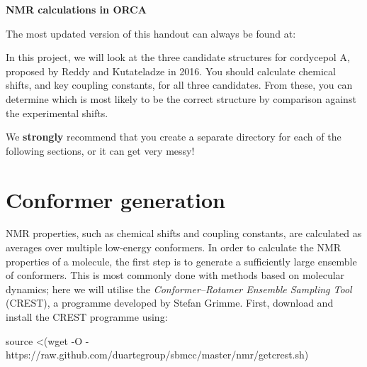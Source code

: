 \documentclass[10pt]{article}
\begin{document}

\textbf{\LARGE NMR calculations in ORCA}

\vspace{0.5cm}

\begin{tcolorbox}[colframe=Green!70!white, colback=Green!10!white, width=0.95\textwidth, center]
    The most updated version of this handout can always be found at:
    \vspace{0.2cm}
    \begin{center}
    \end{center}
\end{tcolorbox}

\vspace{0.2cm}

In this project, we will look at the three candidate structures for cordycepol A, proposed by Reddy and Kutateladze in 2016.\autocite{Reddy2016} You should calculate chemical shifts, and key coupling constants, for all three candidates. From these, you can determine which is most likely to be the correct structure by comparison against the experimental shifts.

\begin{warning}
We \textbf{strongly} recommend that you create a separate directory for each of the following sections, or it can get very messy!
\end{warning}

\section{Conformer generation}

NMR properties, such as chemical shifts and coupling constants, are calculated as averages over multiple low-energy conformers. In order to calculate the NMR properties of a molecule, the first step is to generate a sufficiently large ensemble of conformers. This is most commonly done with methods based on molecular dynamics; here we will utilise the \textit{Conformer--Rotamer Ensemble Sampling Tool} (CREST), a programme developed by Stefan Grimme.\autocite{Bannwarth2019, Grimme2019} First, download and install the CREST programme using:

\begin{cmdline}
source <(wget -O - https://raw.github.com/duartegroup/sbmcc/master/nmr/getcrest.sh)
\end{cmdline}
\end{document}
